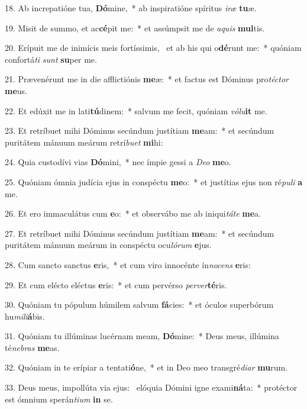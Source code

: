 18. Ab increpatióne tua, \textbf{Dó}mine,~*  ab inspiratióne spíritus \textit{i}\textit{ræ} \textbf{tu}æ.\

19. Misit de summo, et ac\textbf{cé}pit me:~*  et assúmpsit me de \textit{a}\textit{quis} \textbf{mul}tis.\

20. Erípuit me de inimícis meis fortíssimis, \dag\  et ab his qui o\textbf{dé}runt me:~*  quóniam confortá\textit{ti} \textit{sunt} \textbf{su}per me.\

21. Prævenérunt me in die afflictiónis \textbf{me}æ:~*  et factus est Dóminus pro\textit{téc}\textit{tor} \textbf{me}us.\

22. Et edúxit me in lati\textbf{tú}dinem:~*  salvum me fecit, quóniam \textit{vó}\textit{lu}\textbf{it} me.\

23. Et retríbuet mihi Dóminus secúndum justítiam \textbf{me}am:~*  et secúndum puritátem mánuum meárum retrí\textit{bu}\textit{et} \textbf{mi}hi:\

24. Quia custodívi vias \textbf{Dó}mini,~*  nec ímpie gessi a \textit{De}\textit{o} \textbf{me}o.\

25. Quóniam ómnia judícia ejus in conspéctu \textbf{me}o:~*  et justítias ejus non ré\textit{pu}\textit{li} \textbf{a} me.\

26. Et ero immaculátus cum \textbf{e}o:~*  et observábo me ab iniqui\textit{tá}\textit{te} \textbf{me}a.\

27. Et retríbuet mihi Dóminus secúndum justítiam \textbf{me}am:~*  et secúndum puritátem mánuum meárum in conspéctu ocu\textit{ló}\textit{rum} \textbf{e}jus.\

28. Cum sancto sanctus \textbf{e}ris,~*  et cum viro innocénte ín\textit{no}\textit{cens} \textbf{e}ris:\

29. Et cum elécto eléctus \textbf{e}ris:~*  et cum pervérso \textit{per}\textit{ver}\textbf{té}ris.\

30. Quóniam tu pópulum húmilem salvum \textbf{fá}cies:~*  et óculos superbórum hu\textit{mi}\textit{li}\textbf{á}bis.\

31. Quóniam tu illúminas lucérnam meam, \textbf{Dó}mine:~*  Deus meus, illúmina té\textit{ne}\textit{bras} \textbf{me}as.\

32. Quóniam in te erípiar a tentati\textbf{ó}ne,~*  et in Deo meo transgré\textit{di}\textit{ar} \textbf{mu}rum.\

33. Deus meus, impollúta via ejus: \dag\  elóquia Dómini igne exami\textbf{ná}ta:~*  protéctor est ómnium sperán\textit{ti}\textit{um} \textbf{in} se.\

